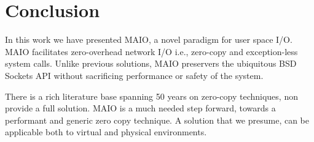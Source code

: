 \documentclass[sigconf,9pt]{acmart}
\newcommand{\oursys}{MAIO\xspace}
\newcommand{\sockets}{BSD Sockets\xspace}
\begin{document}

\section{Conclusion}
In this work we have presented \oursys, a novel paradigm for user space I/O. \oursys facilitates zero-overhead network I/O i.e., zero-copy and exception-less system calls. Unlike previous solutions, \oursys preservers the ubiquitous \sockets API without sacrificing performance or safety of the system.


There is a rich literature base spanning 50 years on zero-copy techniques, non provide a full solution\cite{song2012performance}. \oursys is a much needed step forward, towards a performant and generic zero copy technique. A solution that we presume, can be applicable both to virtual and physical environments.



\end{document}
